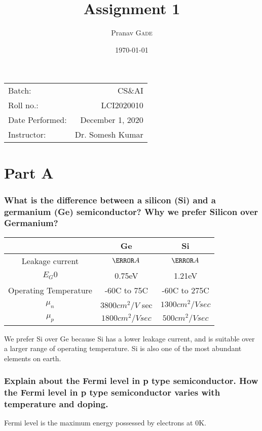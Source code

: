 \documentclass{article}
\title{Assignment 1} %
\author{Pranav \textsc{Gade}} %
\date{\today} %
\begin{document}
\maketitle %

\begin{center}
\begin{tabular}{l r}
Batch: & CS\&AI \\
Roll no.: & LCI2020010 \\
Date Performed: & December 1, 2020 \\ %
Instructor: & Dr. Somesh Kumar %
\end{tabular}
\end{center}


\renewcommand\thesubsubsection{\arabic{subsubsection}}

\section*{Part A}

\subsubsection{What is the difference between a silicon (Si) and a germanium (Ge) semiconductor? Why we prefer Silicon over Germanium?}
\begin{tabular}{|c|c|c|}
	\hline
	& Ge & Si \\
	\hline
	Leakage current & $ \micro A $ & $ \nano A $ \\
	\hline
	$ E_G0 $ & 0.75eV & 1.21eV \\
	\hline
	Operating Temperature & -60C to 75C & -60C to 275C \\
	\hline
	$ \mu_n $ & $ 3800cm^2/V $ sec & $ 1300cm^2/V  sec $ \\
	\hline
	$ \mu_p $ & $ 1800cm^2/V sec $ & $ 500cm^2/V sec $ \\
	\hline
\end{tabular}
We prefer Si over Ge because Si has a lower leakage current, and is suitable over a larger range of operating temperature. Si is also one of the most abundant elements on earth.

\subsubsection{Explain about the Fermi level in p type semiconductor. How the Fermi level in p type semiconductor varies with temperature and doping.}
Fermi level is the maximum energy possessed by electrons at 0K.

\end{document}
